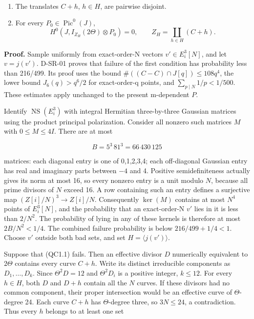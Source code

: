 \begin{enumerate}
\def\labelenumi{\arabic{enumi}.}
\item
  The translates \(C+h\), \(h\in H\), are pairwise disjoint.
\item
  For every \(P_{0}\in \operatorname{Pic}^{0}(J)\), \[
  H^0(J,I_{Z_H}(2\Theta)\otimes P_0)=0,
  \qquad Z_H=\coprod_{h\in H}(C+h).
  \tag{QC1.1}
  \]
\end{enumerate}

\textbf{Proof.} Sample uniformly from exact-order-N vectors
\(v'\in E_i^3[N]\), and let \(v=j(v')\). D-SR-01 proves that failure of
the first condition has probability less than 216/499. Its proof uses
the bound \(\#((C-C)\cap J[q])\le108q^4\), the lower bound
\(J_{6}(q)>q^{6}/2\) for exact-order-q points, and
\(\sum_{p\mid N}1/p<1/500\). These estimates apply unchanged to the
present m-dependent \(P\).

Identify \(\operatorname{NS}(E_i^{3})\) with integral Hermitian
three-by-three Gaussian matrices using the product principal
polarization. Consider all nonzero such matrices \(M\) with
\(0\le M\le 4I\). There are at most

\[
 B=5^3\,81^3=66\,430\,125
\]

matrices: each diagonal entry is one of 0,1,2,3,4; each off-diagonal
Gaussian entry has real and imaginary parts between \(-4\) and 4.
Positive semidefiniteness actually gives its norm at most 16, so every
nonzero entry is a unit modulo \(N\), because all prime divisors of
\(N\) exceed 16. A row containing such an entry defines a surjective map
\((Z[i]/N)^3\to Z[i]/N\). Consequently \(\operatorname{ker}(M)\)
contains at most \(N^{4}\) points of \(E_i^{3}[N]\), and the probability
that an exact-order-N \(v'\) lies in it is less than \(2/N^{2}\). The
probability of lying in any of these kernels is therefore at most
\(2B/N^{2}<1/4\). The combined failure probability is below
\(216/499+1/4<1\). Choose \(v'\) outside both bad sets, and set
\(H=\langle j(v')\rangle\).

Suppose that (QC1.1) fails. Then an effective divisor \(D\) numerically
equivalent to \(2\Theta\) contains every curve \(C+h\). Write its
distinct irreducible components as \(D_{1},\ldots ,D_k\). Since
\(\Theta ^{2}D=12\) and \(\Theta ^{2}D_i\) is a positive integer,
\(k\le 12\). For every \(h\in H\), both \(D\) and \(D+h\) contain all
the \(N\) curves. If these divisors had no common component, their
proper intersection would be an effective curve of \(\Theta\)-degree 24.
Each curve \(C+h\) has \(\Theta\)-degree three, so \(3N\le 24\), a
contradiction. Thus every \(h\) belongs to at least one set

